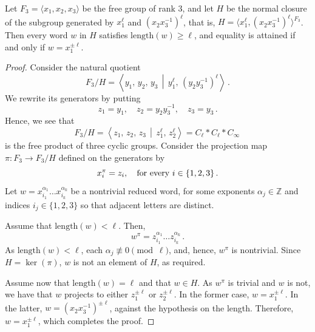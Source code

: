 \documentclass[10pt,a4paper]{amsart}
\newcommand{\Z}{\mathbb{Z}}
\newcommand{\len}{\mathrm{length}}
\begin{document}
\begin{lemma}
\label{lem: powers 1}
Let $F_3 = \langle x_1, x_2, x_3 \rangle$ be the free group of rank $3$, and let $H$ be the normal closure of the subgroup generated by $x_1^\ell$ and $(x_2x_3^{-1})^\ell$, that is, $H = \langle x_1^\ell, (x_2x_3^{-1})^\ell \rangle^{F_3}$. Then every word $w$ in $H$ satisfies $\len(w) \geq \ell$, and equality is attained if and only if $w = x_1^{\pm \ell}$.
\end{lemma}

\begin{proof}
Consider the natural quotient 
\[ F_3/H = \left\langle y_1, \, y_2, \, y_3 \,\middle\vert\, y_1^{\ell}, \, \left(y_2y_3^{-1} \right)^\ell \right\rangle \,.\]
We rewrite its generators by putting
\[z_1 = y_1 , \quad z_2=y_2y_3^{-1} , \quad z_3=y_3 \,.\]
Hence, we see that
\[ F_3/H = \left\langle  z_1, \, z_2, \, z_3 \,\middle\vert\, z_1^\ell, \, z_2^\ell  \right\rangle = C_\ell * C_\ell * C_\infty \,\]
is the free product of three cyclic groups. 
Consider the projection map $\pi: F_3 \to F_3/H$ defined on the generators by
\[x_i ^\pi = z_i, \quad \hbox{for every } i\in\{1,2,3\} \,.\]
Let $w = x_{i_1}^{\alpha_1} \dots x_{i_k}^{\alpha_k}$ be a nontrivial reduced word, for some exponents $\alpha_j \in \Z$ and indices $i_j \in \{1, 2, 3 \}$ so that adjacent letters are distinct.

Assume that $\len(w) < \ell$. Then,
\[ w^\pi = z_{i_1}^{\alpha_{1}} \dots z_{i_k}^{\alpha_k} \,.\]
As $\len(w) < \ell$, each $\alpha_j \not\equiv 0 \pmod{\ell}$, and, hence, $w^\pi$ is nontrivial. Since $H=\ker(\pi)$, $w$ is not an element of $H$, as required.

Assume now that $\len(w)=\ell$ and that $w \in H$. As $w^\pi$ is trivial and $w$ is not, we have that $w$ projects to either $z_1^{\pm\ell}$ or $z_2^{\pm\ell}$. In the former case, $w = x_1^{\pm \ell}$. In the latter,  $w = (x_2x_3^{-1})^{\pm \ell}$, against the hypothesis on the length. Therefore, $w=x_1^{\pm\ell}$, which completes the proof.
\end{proof}
\end{document}
